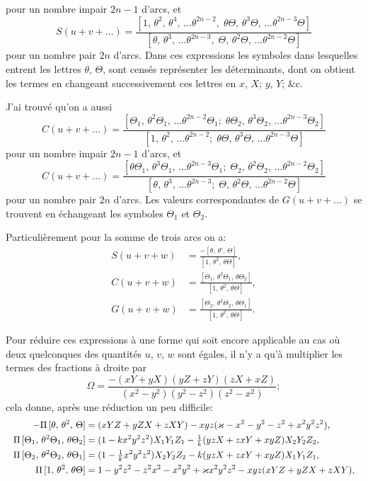 \documentclass[11pt]{article}
\begin{document}
\noindent pour un nombre impair $2n - 1$ d'arcs, et
\[
S(u + v + \dots) = \frac{[1,\,\theta^{2},\,\theta^{4},\,\dots\theta^{2n-2},\;\theta\Theta,\,\theta^{3}\Theta,\,\dots\theta^{2n-3}\Theta]}{[\theta,\,\theta^{3},\,\dots\theta^{2n-3},\;\Theta,\,\theta^{2}\Theta,\,\dots\theta^{2n-2}\Theta]}
\]
pour un nombre pair $2n$ d'arcs. Dans ces expressions les symboles dans lesquelles entrent les lettres $\theta$, $\Theta$, sont cens\'es repr\'esenter les d\'eterminants, dont on obtient les termes en changeant successivement ces lettres en $x$, $X$; $y$, $Y$; \&c.

J'ai trouv\'e qu'on a aussi
\[
C(u + v + \dots) = \frac{[\Theta_{1},\,\theta^{2}\Theta_{1},\,\dots\theta^{2n-2}\Theta_{1};\;\theta\Theta_{2},\,\theta^{3}\Theta_{2},\,\dots\theta^{2n-3}\Theta_{2}]}{[1,\,\theta^{2},\,\dots\theta^{2n-2};\;\theta\Theta,\,\theta^{3}\Theta,\,\dots\theta^{2n-3}\Theta]}
\]
pour un nombre impair $2n - 1$ d'arcs, et
\[
C(u + v + \dots) = \frac{[\theta\Theta_{1},\,\theta^{3}\Theta_{1},\,\dots\theta^{2n-3}\Theta_{1};\;\Theta_{2},\,\theta^{2}\Theta_{2},\,\dots\theta^{2n-2}\Theta_{2}]}{[\theta,\,\theta^{3},\,\dots\theta^{2n-3};\;\Theta,\,\theta^{2}\Theta,\,\dots\theta^{2n-2}\Theta]}
\]
pour un nombre pair $2n$ d'arcs. Les valeurs correspondantes de $G(u + v + \dots)$ se trouvent en \'echangeant les symboles $\Theta_{1}$ et $\Theta_{2}$.

Particuli\`erement pour la somme de trois arcs on a:
\[
\begin{aligned}
S(u + v + w) &= \frac{-[\theta,\,\theta',\,\Theta]}{[1,\,\theta^{2},\,\theta\Theta]},\\
C(u + v + w) &= \frac{[\Theta_{1},\,\theta^{2}\Theta_{1},\,\theta\Theta_{2}]}{[1,\,\theta^{2},\,\theta\Theta]},\\
G(u + v + w) &= \frac{[\Theta_{2},\,\theta^{2}\Theta_{2},\,\theta\Theta_{1}]}{[1,\,\theta^{2},\,\theta\Theta]}.
\end{aligned}
\]

Pour r\'eduire ces expressions \`a une forme qui soit encore applicable au cas o\`u deux quelconques des quantit\'es $u$, $v$, $w$ sont \'egales, il n'y a qu'\`a multiplier les termes des fractions \`a droite par
\[
\Omega = \frac{-(xY + yX)(yZ + zY)(zX + xZ)}{(x^{2} - y^{2})(y^{2} - z^{2})(z^{2} - x^{2})};
\]
cela donne, apr\`es une r\'eduction un peu difficile:
\[ \resizebox{\textwidth}{!}{$\displaystyle
\begin{aligned}
-\Pi\,[\theta,\,\theta^{2},\,\Theta] &= (xYZ + yZX + zXY) - xyz(\varkappa - x^{2} - y^{2} - z^{2} + x^{2}y^{2}z^{2}),\\
\Pi\,[\Theta_{1},\,\theta^{2}\Theta_{1},\,\theta\Theta_{2}] &= (1 - kx^{2}y^{2}z^{2})X_{1}Y_{1}Z_{1} - \tfrac{1}{k}(yzX + zxY + xyZ)X_{2}Y_{2}Z_{2},\\
\Pi\,[\Theta_{2},\,\theta^{2}\Theta_{2},\,\theta\Theta_{1}] &= (1 - \tfrac{1}{k}x^{2}y^{2}z^{2})X_{2}Y_{2}Z_{2} - k(yzX + zxY + xyZ)X_{1}Y_{1}Z_{1},\\
\Pi\,[1,\,\theta^{2},\,\theta\Theta] &= 1 - y^{2}z^{2} - z^{2}x^{2} - x^{2}y^{2} + \varkappa x^{2}y^{2}z^{2} - xyz(xYZ + yZX + zXY),
\end{aligned}
$} \]
\end{document}
